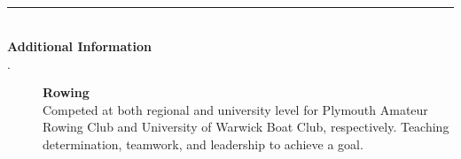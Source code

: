 \documentclass[12pt, a4paper]{article}
\begin{document}
    \vspace{-2ex}
    \noindent\rule{8cm}{0.4pt} \\
    \textbf{Additional Information}
    \begin{description}
        \item[$\cdot$] \textbf{Rowing} \\Competed at both regional and university level for Plymouth Amateur Rowing Club and University of Warwick Boat Club, respectively. Teaching determination, teamwork, and leadership to achieve a goal.
    \end{description}
\end{document}
